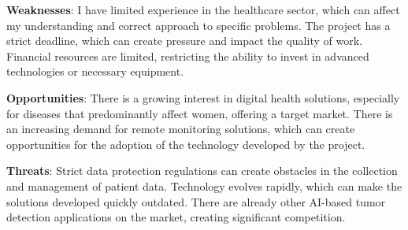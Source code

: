 \textbf{Weaknesses}:
I have limited experience in the healthcare sector, which can affect my understanding and correct approach to specific problems. The project has a strict deadline, which can create pressure and impact the quality of work. Financial resources are limited, restricting the ability to invest in advanced technologies or necessary equipment.

\textbf{Opportunities}:
There is a growing interest in digital health solutions, especially for diseases that predominantly affect women, offering a target market. There is an increasing demand for remote monitoring solutions, which can create opportunities for the adoption of the technology developed by the project.

\textbf{Threats}:
Strict data protection regulations can create obstacles in the collection and management of patient data. Technology evolves rapidly, which can make the solutions developed quickly outdated. There are already other AI-based tumor detection applications on the market, creating significant competition.
